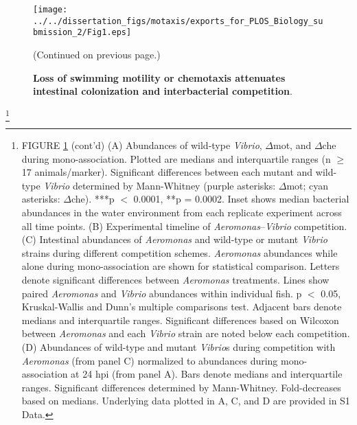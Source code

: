 \begin{figure}%
	\centerline{
		\texttt{[image: ../../dissertation\_figs/motaxis/exports\_for\_PLOS\_Biology\_submission\_2/Fig1.eps]}}
	\caption{\textbf{Loss of swimming motility or chemotaxis attenuates intestinal colonization and interbacterial competition}.}{(Continued on previous page.)}
	\label{fig:motaxis_fig1}
		\end{figure}

{\let\thefootnote\relax\footnote{FIGURE \ref{fig:motaxis_fig1} (cont'd) (A) Abundances of wild-type \textit{Vibrio}, $\Delta$mot, and $\Delta$che during mono-association. Plotted are medians and interquartile ranges (n $\ge$ 17 animals/marker). Significant differences between each mutant and wild-type \textit{Vibrio} determined by Mann-Whitney (purple asterisks: $\Delta$mot; cyan asterisks: $\Delta$che). ***p $ < $ 0.0001, **p = 0.0002. Inset shows median bacterial abundances in the water environment from each replicate experiment across all time points. (B) Experimental timeline of \textit{Aeromonas}–\textit{Vibrio} competition. (C) Intestinal abundances of \textit{Aeromonas} and wild-type or mutant \textit{Vibrio} strains during different competition schemes. \textit{Aeromonas} abundances while alone during mono-association are shown for statistical comparison. Letters denote significant differences between \textit{Aeromonas} treatments. Lines show paired \textit{Aeromonas} and \textit{Vibrio} abundances within individual fish. p $ < $ 0.05, Kruskal-Wallis and Dunn's multiple comparisons test. Adjacent bars denote medians and interquartile ranges. Significant differences based on Wilcoxon between \textit{Aeromonas} and each \textit{Vibrio} strain are noted below each competition. (D) Abundances of wild-type and mutant \textit{Vibrio}s during competition with \textit{Aeromonas} (from panel C) normalized to abundances during mono-association at 24 hpi (from panel A). Bars denote medians and interquartile ranges. Significant differences determined by Mann-Whitney. Fold-decreases based on medians. Underlying data plotted in A, C, and D are provided in S1 Data.}

}
